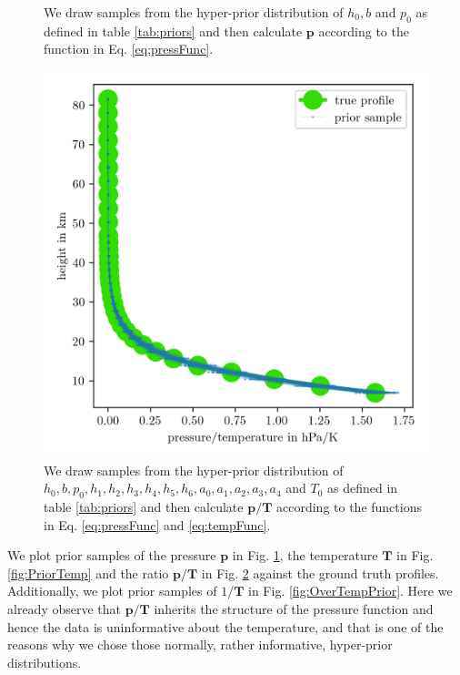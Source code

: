 \begin{figure}[ht!]
	\centering
	
	\caption[Prior Samples of $\bm{p}$ according to the respective hyper-prior distribution.]{We draw samples from the hyper-prior distribution of $h_0, b$ and $p_0$ as defined in table \ref{tab:priors} and then calculate $\bm{p}$ according to the function in Eq. \ref{eq:pressFunc}.}
	\label{fig:PriorPress}
\end{figure}
\begin{figure}[ht!]
	\centering
	\includegraphics{PriorTempOverPostMeanSigm.png}
	\caption[Prior Samples of $\bm{p}/\bm{T}$ according to the respective hyper-prior distribution.]{We draw samples from the hyper-prior distribution of $h_0, b, p_0, h_1, h_2,h_3,h_4,h_5,h_6, a_0, a_1, a_2,a_3,a_4$ and $T_0$ as defined in table \ref{tab:priors} and then calculate $\bm{p}/\bm{T}$ according to the functions in Eq. \ref{eq:pressFunc} and \ref{eq:tempFunc}.}
	\label{fig:PriorPressOverTemp}
\end{figure}
We plot prior samples of the pressure $\bm{p}$ in Fig. \ref{fig:PriorPress}, the temperature $\bm{T}$ in Fig. \ref{fig:PriorTemp} and the ratio $\bm{p}/\bm{T}$ in Fig. \ref{fig:PriorPressOverTemp} against the ground truth profiles.
Additionally, we plot prior samples of $1/\bm{T}$ in Fig. \ref{fig:OverTempPrior}.
Here we already observe that $\bm{p}/\bm{T}$ inherits the structure of the pressure function and hence the data is uninformative about the temperature, and that is one of the reasons why we chose those normally, rather informative, hyper-prior distributions.
\clearpage

